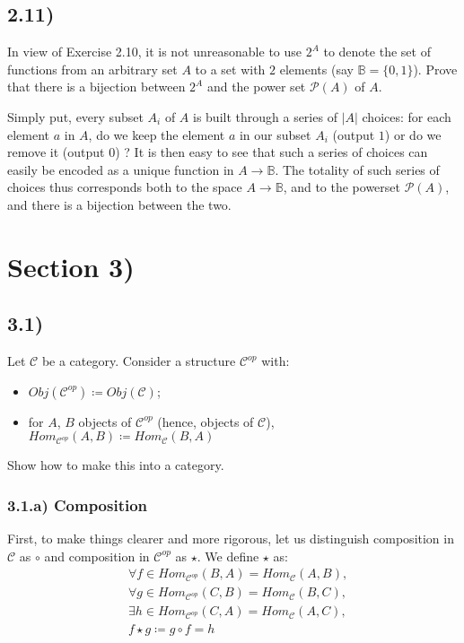 \documentclass[12pt, letterpaper, twoside]{report}
\begin{document}
\subsection*{2.11)}

In view of Exercise 2.10, it is not unreasonable to use $2^A$ to denote the set of functions from an arbitrary set $A$ to a set with $2$ elements (say $\mathbb{B} = \{0, 1\}$). Prove that there is a bijection between $2^A$ and the power set $\mathcal{P}(A)$ of $A$.

Simply put, every subset $A_i$ of $A$ is built through a series of $|A|$ choices: for each element $a$ in $A$, do we keep the element $a$ in our subset $A_i$ (output $1$) or do we remove it (output $0$) ? It is then easy to see that such a series of choices can easily be encoded as a unique function in $A \to \mathbb{B}$. The totality of such series of choices thus corresponds both to the space $A \to \mathbb{B}$, and to the powerset $\mathcal{P}(A)$, and there is a bijection between the two. 
\section*{Section 3)}

\subsection*{3.1)}

Let $\mathcal{C}$ be a category. Consider a structure $\mathcal{C}^{op}$ with:
\begin{itemize}
	\item $Obj(\mathcal{C}^{op}) \coloneqq Obj(\mathcal{C})$;
	\item for $A$, $B$ objects of $\mathcal{C}^{op}$ (hence, objects of $\mathcal{C}$), $Hom_{\mathcal{C}^{op}} (A, B) \coloneqq Hom_{\mathcal{C}} (B, A)$
\end{itemize}
Show how to make this into a category.

\subsubsection*{3.1.a) Composition}

First, to make things clearer and more rigorous, let us distinguish composition in $\mathcal{C}$ as $\circ$ and composition in $\mathcal{C}^{op}$ as $\star$. We define $\star$ as:
$$
\begin{aligned}
	& \forall f \in Hom_{\mathcal{C}^{op}} (B, A) = Hom_{\mathcal{C}} (A, B), \\
	& \forall g \in Hom_{\mathcal{C}^{op}} (C, B) = Hom_{\mathcal{C}} (B, C), \\
	& \exists h \in Hom_{\mathcal{C}^{op}} (C, A) = Hom_{\mathcal{C}} (A, C), \\
	& f \star g \coloneqq g \circ f = h
\end{aligned}
$$
\end{document}
